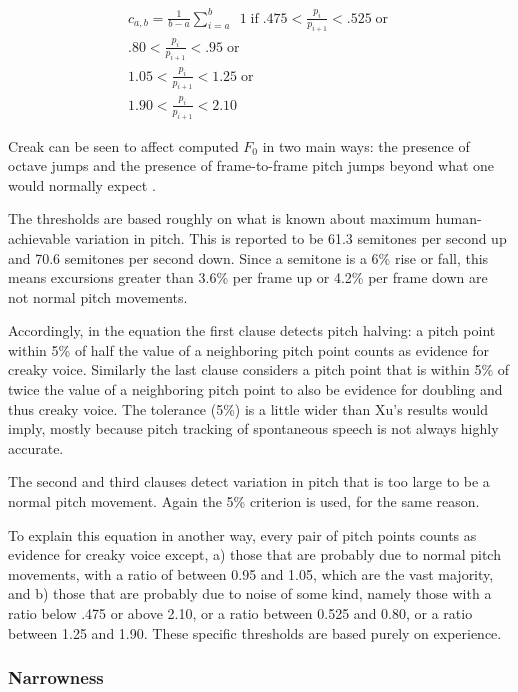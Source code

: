 \documentclass[11pt]{article}
\begin{document}
\begin{multline}
c_{a,b} = \frac{1}{b-a} \sum\limits_{i=a}^b \enspace 1 \operatorname{if}  .475 < \frac{p_i}{p_{i+1}} < .525 \operatorname{or} \\  .80 < \frac{p_i}{ p_{i+1}} < .95  \operatorname{or} \\ 1.05 < \frac{p_i}{ p_{i+1}} < 1.25 \operatorname{or} \\ 1.90 < \frac{p_i}{ p_{i+1}} < 2.10
\end{multline}

Creak can be seen to affect computed $F_0$ in two main ways: the
presence of octave jumps and the presence of frame-to-frame pitch
jumps beyond what one would normally expect \cite{keating15}.

The thresholds are based roughly on what is known about maximum
human-achievable variation in pitch.  This is reported to be 61.3
semitones per second up and 70.6 semitones per second
down\cite{xu02-pitch-change-rate}.  Since a semitone is a 6\% rise or
fall, this means excursions greater than 3.6\% per frame up or
4.2\% per frame down are not normal pitch movements. 

Accordingly, in the equation the first clause detects pitch halving: a
pitch point within 5\% of half the value of a neighboring pitch point
counts as evidence for creaky voice.  Similarly the last clause
considers a pitch point that is within 5\% of twice the value of a
neighboring pitch point to also be evidence for doubling and thus
creaky voice.  The tolerance (5\%) is a little wider than Xu's results
would imply, mostly because pitch tracking of spontaneous speech is
not always highly accurate.

The second and third clauses detect variation in pitch that is too
large to be a normal pitch movement.  Again the 5\% criterion is used,
for the same reason.  

To explain this equation in another way, every pair of pitch points
counts as evidence for creaky voice except, a) those that are probably
due to normal pitch movements, with a ratio of between 0.95 and 1.05,
which are the vast majority, and b) those that are probably due to
noise of some kind, namely those with a ratio below .475 or above
2.10, or a ratio between 0.525 and 0.80, or a ratio between 1.25 and
1.90.  These specific thresholds are based purely on experience.

\subsubsection{Narrowness}
\end{document}
